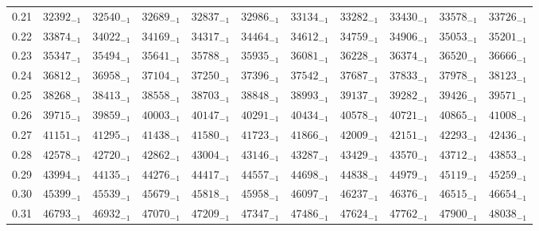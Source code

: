 \documentclass[10pt, a4paper]{article}
\begin{document}
\begin{center}
\begin{longtable}{c || c c c c c | c c c c c}
        0.21 & \({32392}_{-1}\) & \({32540}_{-1}\) & \({32689}_{-1}\) & \({32837}_{-1}\) & \({32986}_{-1}\) & \({33134}_{-1}\) & \({33282}_{-1}\) & \({33430}_{-1}\) & \({33578}_{-1}\) & \({33726}_{-1}\)\\
        0.22 & \({33874}_{-1}\) & \({34022}_{-1}\) & \({34169}_{-1}\) & \({34317}_{-1}\) & \({34464}_{-1}\) & \({34612}_{-1}\) & \({34759}_{-1}\) & \({34906}_{-1}\) & \({35053}_{-1}\) & \({35201}_{-1}\)\\
        0.23 & \({35347}_{-1}\) & \({35494}_{-1}\) & \({35641}_{-1}\) & \({35788}_{-1}\) & \({35935}_{-1}\) & \({36081}_{-1}\) & \({36228}_{-1}\) & \({36374}_{-1}\) & \({36520}_{-1}\) & \({36666}_{-1}\)\\
        0.24 & \({36812}_{-1}\) & \({36958}_{-1}\) & \({37104}_{-1}\) & \({37250}_{-1}\) & \({37396}_{-1}\) & \({37542}_{-1}\) & \({37687}_{-1}\) & \({37833}_{-1}\) & \({37978}_{-1}\) & \({38123}_{-1}\)\\
        0.25 & \({38268}_{-1}\) & \({38413}_{-1}\) & \({38558}_{-1}\) & \({38703}_{-1}\) & \({38848}_{-1}\) & \({38993}_{-1}\) & \({39137}_{-1}\) & \({39282}_{-1}\) & \({39426}_{-1}\) & \({39571}_{-1}\)\\
        0.26 & \({39715}_{-1}\) & \({39859}_{-1}\) & \({40003}_{-1}\) & \({40147}_{-1}\) & \({40291}_{-1}\) & \({40434}_{-1}\) & \({40578}_{-1}\) & \({40721}_{-1}\) & \({40865}_{-1}\) & \({41008}_{-1}\)\\
        0.27 & \({41151}_{-1}\) & \({41295}_{-1}\) & \({41438}_{-1}\) & \({41580}_{-1}\) & \({41723}_{-1}\) & \({41866}_{-1}\) & \({42009}_{-1}\) & \({42151}_{-1}\) & \({42293}_{-1}\) & \({42436}_{-1}\)\\
        0.28 & \({42578}_{-1}\) & \({42720}_{-1}\) & \({42862}_{-1}\) & \({43004}_{-1}\) & \({43146}_{-1}\) & \({43287}_{-1}\) & \({43429}_{-1}\) & \({43570}_{-1}\) & \({43712}_{-1}\) & \({43853}_{-1}\)\\
        0.29 & \({43994}_{-1}\) & \({44135}_{-1}\) & \({44276}_{-1}\) & \({44417}_{-1}\) & \({44557}_{-1}\) & \({44698}_{-1}\) & \({44838}_{-1}\) & \({44979}_{-1}\) & \({45119}_{-1}\) & \({45259}_{-1}\)\\
        \hline
        0.30 & \({45399}_{-1}\) & \({45539}_{-1}\) & \({45679}_{-1}\) & \({45818}_{-1}\) & \({45958}_{-1}\) & \({46097}_{-1}\) & \({46237}_{-1}\) & \({46376}_{-1}\) & \({46515}_{-1}\) & \({46654}_{-1}\)\\
        0.31 & \({46793}_{-1}\) & \({46932}_{-1}\) & \({47070}_{-1}\) & \({47209}_{-1}\) & \({47347}_{-1}\) & \({47486}_{-1}\) & \({47624}_{-1}\) & \({47762}_{-1}\) & \({47900}_{-1}\) & \({48038}_{-1}\)\\

\end{longtable}
\end{center}
\end{document}
